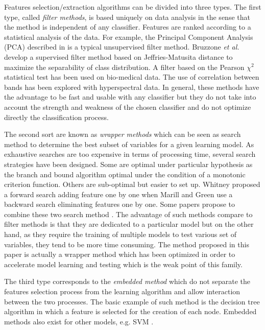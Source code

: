 \documentclass[journal]{IEEEtran}
\begin{document}
Features selection/extraction algorithms can be divided into three types. The first type, called \emph{filter methods}, is based uniquely on data analysis in the sense that the method is independent of any classifier. Features are ranked according to a statistical analysis of the data. For example, the Principal Component Analysis (PCA) described in \cite{jimenez1998supervised} is a typical unsupervised filter method. Bruzzone \emph{et al.}\cite{bruzzone1995extension} develop a supervised filter method based on Jeffries-Matusita distance to maximize the separability of class distribution. A filter based on the Pearson $\chi^2$ statistical test has been used on bio-medical data\cite{biesiada2007feature}. The use of correlation between bands has been explored with hyperspectral data\cite{demir2008phase}. In general, these methods have the advantage to be fast and usable with any classifier but they do not take into account the strength and weakness of the chosen classifier and do not optimize directly the classification process.

The second sort are known as \emph{wrapper methods} which can be seen as search method to determine the best subset of variables for a given learning model. As exhaustive searches are too expensive in terms of processing time, several search strategies have been designed. Some are optimal under particular hypothesis as the branch and bound algorithm \cite{narendra1977branch} optimal under the condition of a monotonic criterion function. Others are sub-optimal but easier to set up. Whitney \cite{whitney1971direct} proposed a forward search adding feature one by one \cite{whitney1971direct} when Marill and Green \cite{marill1963effectiveness} use a backward search eliminating features one by one. Some papers propose to combine these two search method \cite{somol1999adaptive}. The advantage of such methods compare to filter methods is that they are dedicated to a particular model but on the other hand, as they require the training of multiple models to test various set of variables, they tend to be more time consuming. The method proposed in this paper is actually a wrapper method which has been optimized in order to accelerate model learning and testing which is the weak point of this family.

The third type corresponds to the \emph{embedded method} which do not separate the features selection process from the learning algorithm and allow interaction between the two processes. The basic example of such method is the decision tree algorithm in which a feature is selected for the creation of each node. Embedded methods also exist for other models, e.g. SVM \cite{guyon2002gene,weston2003use}.
\end{document}
